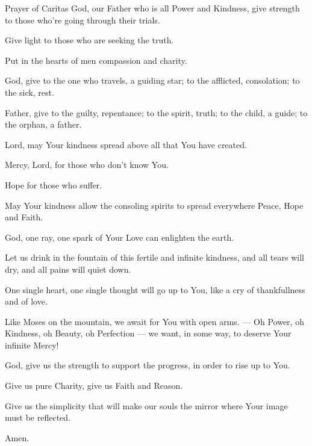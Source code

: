   \begin{passage}[EN]{Prayer of Caritas}
    God, our Father who is all Power and Kindness,
    give strength to those who're going through
    their trials.
    \par
    Give light to those who are seeking the truth.
    \par
    Put in the hearts of men compassion and charity.
    \par
    God, give to the one who travels, a guiding star;
    to the afflicted, consolation; to the sick, rest.
    \par
    Father, give to the guilty, repentance; to the
    spirit, truth; to the child, a guide; to the orphan,
    a father.
    \par
    Lord, may Your kindness spread above all that You
    have created.
    \par
    Mercy, Lord, for those who don't know You.
    \par
    Hope for those who suffer.
    \par
    May Your kindness allow the consoling spirits to
    spread everywhere Peace, Hope and Faith.
    \par
    God, one ray, one spark of Your Love can enlighten
    the earth.
    \par
    Let us drink in the fountain of this fertile and
    infinite kindness, and all tears will dry, and all pains
    will quiet down.
    \par
    One single heart, one single thought will go up to
    You, like a cry of thankfullness and of love.
    \par
    Like Moses on the mountain, we await for You with
    open arms. --- Oh Power, oh Kindness, oh Beauty, oh Perfection --- we want, in some way, to deserve Your infinite Mercy!
    \par
    God, give us the strength to support the progress,
    in order to rise up to You.
    \par
    Give us pure Charity, give us Faith and Reason.
    \par
    Give us the simplicity that will make our souls the
    mirror where Your image must be reflected.
    \par
    Amen.
  \end{passage}

